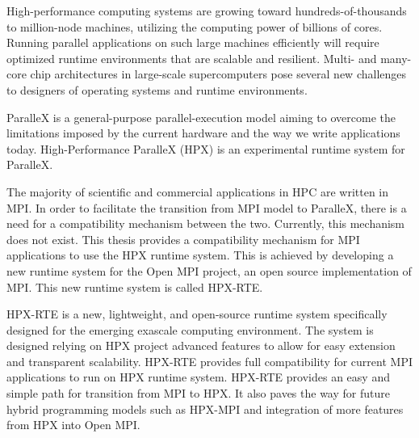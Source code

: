High-performance computing systems are growing toward hundreds-of-thousands to million-node machines, utilizing the computing power of billions of cores. Running parallel applications on such large machines efficiently will require optimized runtime environments that are scalable and resilient. Multi- and many-core chip architectures in large-scale supercomputers pose several new challenges to designers of operating systems and runtime environments.

ParalleX is a general-purpose parallel-execution model aiming to overcome the limitations imposed by the current hardware and the way we write applications today. High-Performance ParalleX (HPX) is an experimental runtime system for ParalleX.

The majority of scientific and commercial applications in HPC are written in MPI. In order to facilitate the transition from MPI model to ParalleX, there is a need for a compatibility mechanism between the two. Currently, this mechanism does not exist. This thesis provides a compatibility mechanism for MPI applications to use the HPX runtime system. This is achieved by developing a new runtime system for the Open MPI project, an open source implementation of MPI. This new runtime system is called HPX-RTE.

HPX-RTE is a new, lightweight, and open-source runtime system specifically designed for the emerging exascale computing environment. The system is designed relying on HPX project advanced features to allow for easy extension and transparent scalability. HPX-RTE provides full compatibility for current MPI applications to run on HPX runtime system. HPX-RTE provides an easy and simple path for transition from MPI to HPX. It also paves the way for future hybrid programming models such as HPX-MPI and integration of more features from HPX into Open MPI.
